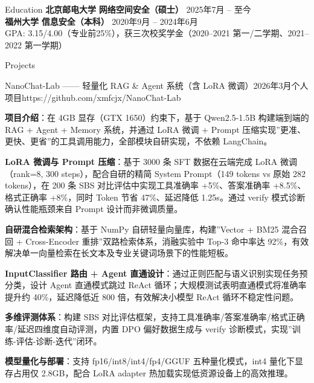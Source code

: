 \documentclass{resume}
\begin{document}

\begin{rSection}{Education}
\noindent\textbf{北京邮电大学} \hfill \textbf{网络空间安全（硕士）} \hfill 2025年7月 -- 至今 \\
\noindent\textbf{福州大学} \hfill \textbf{信息安全（本科）} \hfill 2020年9月 -- 2024年6月 \\
GPA: 3.15/4.00（专业前25\%），获三次校奖学金（2020--2021 第一/二学期、2021--2022 第一学期）
\end{rSection}


\begin{rSection}{Projects}
\begin{rSubsection}{NanoChat-Lab —— 轻量化 RAG \& Agent 系统（含 LoRA 微调）}{2026年3月}{个人项目}{https://github.com/xmfcjx/NanoChat-Lab}
\item \textbf{项目介绍}：在 4GB 显存（GTX 1650）约束下，基于 Qwen2.5-1.5B 构建端到端的 RAG + Agent + Memory 系统，并通过 LoRA 微调 + Prompt 压缩实现”更准、更快、更省”的工具调用能力，全部模块自研实现，不依赖 LangChain。
\item \textbf{LoRA 微调与 Prompt 压缩}：基于 3000 条 SFT 数据在云端完成 LoRA 微调（rank=8, 300 steps），配合自研的精简 System Prompt（149 tokens vs 原始 282 tokens），在 200 条 SBS 对比评估中实现工具准确率 +5\%、答案准确率 +8.5\%、格式正确率 +8\%，同时 Token 节省 47\%、延迟降低 1.25s。通过 verify 模式诊断确认性能瓶颈来自 Prompt 设计而非微调质量。
\item \textbf{自研混合检索架构}：基于 NumPy 自研轻量向量库，构建”Vector + BM25 混合召回 + Cross-Encoder 重排”双路检索体系，消融实验中 Top-3 命中率达 92\%，有效解决单一向量检索在长文本及专业关键词场景下的性能短板。
\item \textbf{InputClassifier 路由 + Agent 直通设计}：通过正则匹配与语义识别实现任务预分类，设计 Agent 直通模式跳过 ReAct 循环；大规模测试表明直通模式将准确率提升约 40\%，延迟降低近 800 倍，有效解决小模型 ReAct 循环不稳定性问题。
\item \textbf{多维评测体系}：构建 SBS 对比评估框架，支持工具准确率/答案准确率/格式正确率/延迟四维度自动评测，内置 DPO 偏好数据生成与 verify 诊断模式，实现”训练-评估-诊断-迭代”闭环。
\item \textbf{模型量化与部署}：支持 fp16/int8/int4/fp4/GGUF 五种量化模式，int4 量化下显存占用仅 2.8GB，配合 LoRA adapter 热加载实现低资源设备上的高效推理。
\end{rSubsection}
\end{rSection}
\end{document}
